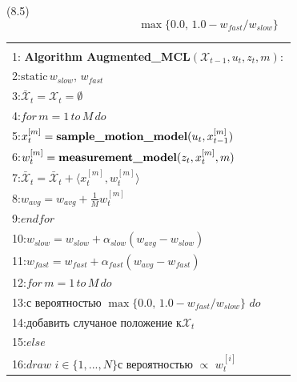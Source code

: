 \documentclass[10pt,a4paper]{article}
\begin{document}
(8.5)
$$\max\{0.0,\,1.0-w_{fast}/w_{slow}\}$$

\begin{table}[H]
\begin{center}
\begin{tabular}{|l|}
\hline
{}\\
1: \textbf{Algorithm Augmented\_MCL}$(\mathcal{X}_{t-1},u_t,z_t,m):$ \\
2:\hspace{5mm}$\text{static}\,w_{slow},\,w_{fast}$\\
3:\hspace{5mm}$\bar{\mathcal{X}}_t=\mathcal{X}_t=\emptyset$\\
4:\hspace{5mm}$\textit{for}\,m=1\,\textit{to}\,M\,\textit{do}$\\
5:\hspace{10mm}$x_t^{[m]}=\text{\textbf{sample\_motion\_model}}(u_t,x_{t-1}^{[m]})$\\
6:\hspace{10mm}$w_t^{[m]}=\text{\textbf{measurement\_model}}(z_t,x_t^{[m]},m)$\\
7:\hspace{10mm}$\bar{\mathcal{X}}_t=\bar{\mathcal{X}}_t+\langle x_t^{[m]},w_t^{[m]}\rangle$\\
8:\hspace{10mm}$w_{avg}=w_{avg}+\frac{1}{M}w_t^{[m]}$\\
9:\hspace{5mm}$\textit{endfor}$\\
10:\hspace{4mm}$w_{slow}=w_{slow}+\alpha_{slow}(w_{avg}-w_{slow})$\\
11:\hspace{4mm}$w_{fast}=w_{fast}+\alpha_{fast}(w_{avg}-w_{fast})$\\
12:\hspace{4mm}$\textit{for}\,m=1\,\textit{to}\,M\,\textit{do}$\\
13:\hspace{9mm}$\textit{с вероятностью}\,\,\max\{0.0,\,1.0-w_{fast}/w_{slow}\}\,\,\textit{do}$\\
14:\hspace{14mm}$\textit{добавить случаное положение к}\mathcal{X}_t$\\
15:\hspace{9mm}$\textit{else}$\\
16:\hspace{14mm}$\textit{draw}\,\,i\in\{1,...,N\}\textit{с вероятностью}\,\,\propto\,\,w_t^{[i]}$\\

\end{tabular}
\end{center}
\end{table}
\end{document}
